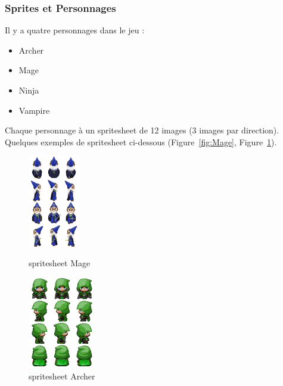 \documentclass[11pt]{article}
\begin{document}
            \subsubsection{Sprites et Personnages}
            Il y a quatre personnages dans le jeu :
            \begin{itemize}
                \item Archer
                \item Mage
                \item Ninja
                \item Vampire
            \end{itemize}
            Chaque personnage à un spritesheet de 12 images (3 images par direction).\\
            Quelques exemples de spritesheet ci-dessous (Figure~\ref{fig:Mage}, Figure~\ref{fig:Archer}). 
            \begin{figure}[H]
                \centering
                \begin{minipage}{0.45\textwidth}
                    \centering
                    \includegraphics[height=4cm]{mageSrc.png}
                    \caption{spritesheet Mage}
                    \label{fig:Mage}
                \end{minipage}
                \hfill
                \begin{minipage}{0.45\textwidth}
                    \centering
                    \includegraphics[height=4cm]{archerSRC.png}
                    \caption{spritesheet Archer}
                    \label{fig:Archer}
                \end{minipage}
            \end{figure}
\end{document}

